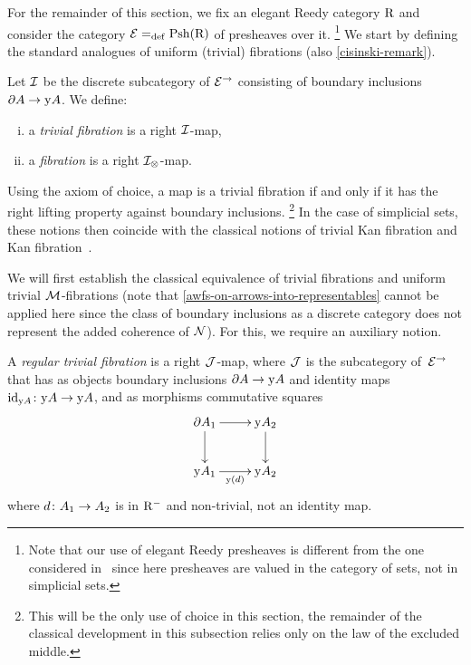 \documentclass[reqno,10pt,a4paper,oneside,draft]{amsart}
\begin{document}
\medskip

For the remainder of this section, we fix an elegant Reedy category $\R$ and consider the category $\calE \defeq \Rhat$ of presheaves over it.%
\footnote{Note that our use of elegant Reedy presheaves is different from the one considered in~\cite{shulman:reedy} since here presheaves are valued in the category of sets, not in simplicial sets.}
We start by defining the standard analogues of uniform (trivial) fibrations (\cf also \cref{cisinski-remark}).

\begin{definition}
Let $\cal{I}$ be the discrete subcategory of $\catE^{\to}$ consisting of boundary inclusions $\partial A \to \yon A$.
We define:
\begin{enumerate}[(i)]
\item a \emph{trivial fibration} is a right $\cal{I}$-map,
\item a \emph{fibration} is a right $\cal{I}_\otimes$-map.
\end{enumerate}
\end{definition}

Using the axiom of choice, a map is a trivial fibration if and only if it has the right lifting property against boundary inclusions.%
\footnote{This will be the only use of choice in this section, the remainder of the classical development in this subsection relies only on the law of the excluded middle.}
In the case of simplicial sets, these notions then coincide with the classical notions of trivial Kan fibration and Kan fibration~\cite[Chap.~IV, Sec.~2]{gabriel-zisman:calculus-of-fractions}.

\medskip

We will first establish the classical equivalence of trivial fibrations and uniform trivial $\cal{M}$-fibrations (note that \cref{awfs-on-arrows-into-representables} cannot be applied here since the class of boundary inclusions as a discrete category does not represent the added coherence of $\cal{N}$).
For this, we require an auxiliary notion.

\begin{definition}
A \emph{regular trivial fibration} is a right $\cal{J}$-map, where $\cal{J}$ is the subcategory of~$\catE^{\to}$ that has as objects boundary inclusions $\partial A \to \yon A$ and identity maps $\id_{\yon A} \co \yon A \to \yon A$, and as morphisms commutative squares
\[
\xymatrix{
  \partial A_1
  \ar[r]
  \ar[d]
&
  \yon A_2
  \ar[d]
\\
  \yon A_1
  \ar[r]_{\yon(d)}
&
  \yon A_2
}
\]
where $d \co A_1 \to A_2$ is in $\Rm$ and non-trivial, \ie not an identity map.
\end{definition}
\end{document}
